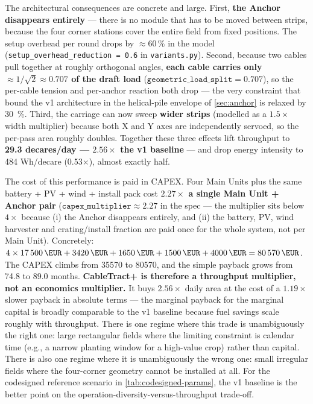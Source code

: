 \documentclass[11pt,a4paper]{article}
\begin{document}
The architectural consequences are concrete and large. First, \textbf{the Anchor disappears entirely} --- there is no module that has to be moved between strips, because the four corner stations cover the entire field from fixed positions. The setup overhead per round drops by ${\approx}60\,\%$ in the model (\texttt{setup\_overhead\_reduction = 0.6} in \texttt{variants.py}). Second, because two cables pull together at roughly orthogonal angles, \textbf{each cable carries only ${\approx}1/\sqrt{2} \approx 0.707$ of the draft load} ($\texttt{geometric\_load\_split} = 0.707$), so the per-cable tension and per-anchor reaction both drop --- the very constraint that bound the v1 architecture in the helical-pile envelope of \cref{sec:anchor} is relaxed by \SI{30}{\percent}. Third, the carriage can now sweep \textbf{wider strips} (modelled as a $1.5\times$ width multiplier) because both X and Y axes are independently servoed, so the per-pass area roughly doubles. Together these three effects lift throughput to \textbf{29.3 decares/day --- $2.56\times$ the v1 baseline} --- and drop energy intensity to 484 Wh/decare (0.53$\times$), almost exactly half.

The cost of this performance is paid in CAPEX. Four Main Units plus the same battery + PV + wind + install pack cost \textbf{$2.27\times$ a single Main Unit + Anchor pair} ($\texttt{capex\_multiplier} \approx 2.27$ in the spec --- the multiplier sits below $4\times$ because (i) the Anchor disappears entirely, and (ii) the battery, PV, wind harvester and crating/install fraction are paid once for the whole system, not per Main Unit). Concretely: $4 \times \SI{17500}{\EUR} + \SI{3420}{\EUR} + \SI{1650}{\EUR} + \SI{1500}{\EUR} + \SI{4000}{\EUR} = \SI{80570}{\EUR}$. The CAPEX climbs from \SI{35570}{\EUR} to \SI{80570}{\EUR}, and the simple payback grows from 74.8 to 89.0 months. \textbf{CableTract+ is therefore a throughput multiplier, not an economics multiplier.} It buys $2.56\times$ daily area at the cost of a $1.19\times$ slower payback in absolute terms --- the marginal payback for the marginal capital is broadly comparable to the v1 baseline because fuel savings scale roughly with throughput. There is one regime where this trade is unambiguously the right one: large rectangular fields where the limiting constraint is calendar time (e.g., a narrow planting window for a high-value crop) rather than capital. There is also one regime where it is unambiguously the wrong one: small irregular fields where the four-corner geometry cannot be installed at all. For the codesigned reference scenario in \cref{tab:codesigned-params}, the v1 baseline is the better point on the operation-diversity-versus-throughput trade-off.
\end{document}
